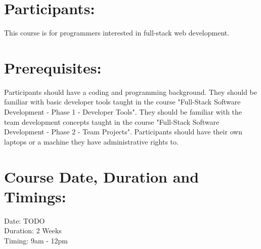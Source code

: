 \documentclass[a4paper,11pt]{article}
\begin{document}
\section{Participants:}
This course is for programmers interested in full-stack web development. 

\section{Prerequisites:}
Participants should have a coding and programming background. They should be familiar with basic developer tools taught in the course "Full-Stack Software Development - Phase 1 - Developer Tools". They should be familiar with the team development concepts taught in the course "Full-Stack Software Development - Phase 2 - Team Projects". Participants should have their own laptops or a machine they have administrative rights to.

\section{Course Date, Duration and Timings:}
Date: TODO\\
Duration: 2 Weeks\\
Timing: 9am - 12pm
\end{document}
